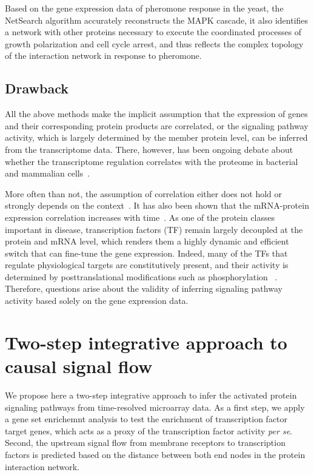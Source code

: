 Based on the gene expression data of pheromone response in the yeast, the 
NetSearch algorithm accurately reconstructs the MAPK cascade, it also identifies a 
network with other proteins necessary to execute the coordinated processes of 
growth polarization and cell cycle arrest, and thus 
reflects the complex topology of 
the interaction network in response to pheromone.

\subsection{Drawback}
All the above methods make the implicit assumption that the expression of genes
and their corresponding protein products are correlated, or the signaling 
pathway activity, which is largely determined by the member protein level, 
can be inferred from the transcriptome data. There, however, 
has been ongoing debate 
about whether the transcriptome regulation correlates with the proteome
in bacterial and mammalian cells~\citep{Taniguchi2010,Ghazalpour2011}. 

More
often than not, the assumption of correlation either does not hold or strongly depends on the context~\citep{Soufi2009}. 
It has also been shown that the mRNA-protein expression correlation increases 
with time~\citep{Fournier2010}.
As one of the protein classes important in disease, 
transcription factors (TF) remain largely decoupled at the 
protein
and mRNA level, which renders them a highly dynamic and efficient switch that 
can fine-tune the gene expression. Indeed, many of the TFs that regulate physiological
    targets are constitutively present, and their activity is determined
    by posttranslational modifications such as phosphorylation%
    ~\citep{Messina2004}.
Therefore, questions arise about the validity of inferring signaling 
pathway activity based solely on the gene expression data.

\section{Two-step integrative approach to causal signal flow}
We propose here a two-step integrative approach to infer the activated protein signaling
pathways from time-resolved microarray data. As a first step, we apply a
gene set enrichemnt analysis to test the
enrichment of transcription factor target genes, which acts as a proxy of
the transcription factor activity \emph{per se}. Second, the upstream 
signal flow from membrane receptors to transcription factors is predicted 
based on the distance between both end nodes in the protein interaction
network.

